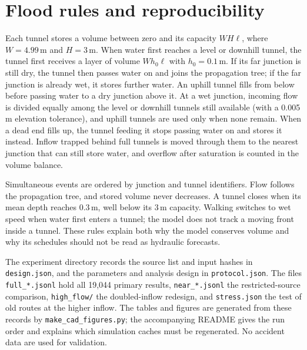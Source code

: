 \documentclass[11pt,a4paper]{article}
\begin{document}
\section{Flood rules and reproducibility}\label{app:flood}
Each tunnel stores a volume between zero and its capacity $WH\ell$, where $W=4.99$\,m and $H=3$\,m. When water first reaches a level or downhill tunnel, the tunnel first receives a layer of volume $Wh_0\ell$ with $h_0=0.1$\,m. If its far junction is still dry, the tunnel then passes water on and joins the propagation tree; if the far junction is already wet, it stores further water. An uphill tunnel fills from below before passing water to a dry junction above it. At a wet junction, incoming flow is divided equally among the level or downhill tunnels still available (with a 0.005\,m elevation tolerance), and uphill tunnels are used only when none remain. When a dead end fills up, the tunnel feeding it stops passing water on and stores it instead. Inflow trapped behind full tunnels is moved through them to the nearest junction that can still store water, and overflow after saturation is counted in the volume balance.

Simultaneous events are ordered by junction and tunnel identifiers. Flow follows the propagation tree, and stored volume never decreases. A tunnel closes when its mean depth reaches 0.3\,m, well below its 3\,m capacity. Walking switches to wet speed when water first enters a tunnel; the model does not track a moving front inside a tunnel. These rules explain both why the model conserves volume and why its schedules should not be read as hydraulic forecasts.

The experiment directory records the source list and input hashes in \texttt{design.json}, and the parameters and analysis design in \texttt{protocol.json}. The files \texttt{full\_*.jsonl} hold all 19,044 primary results, \texttt{near\_*.jsonl} the restricted-source comparison, \texttt{high\_flow/} the doubled-inflow redesign, and \texttt{stress.json} the test of old routes at the higher inflow. The tables and figures are generated from these records by \texttt{make\_cad\_figures.py}; the accompanying README gives the run order and explains which simulation caches must be regenerated. No accident data are used for validation.
\end{document}
